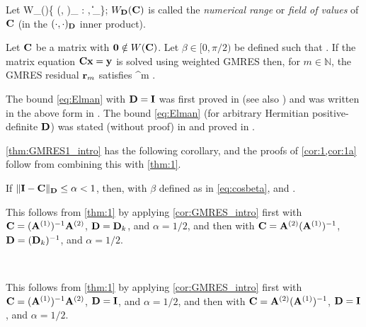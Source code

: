 Let 
\beq\label{eq:fov}
W_\Dmat(\matrixC)\de \Big\{ (\matrixC \bx, \bx)_{\Dmat} : \bx \in \CCN, \|\bx\|_\Big\};
\eeq
$W_{\mathbf{D}}(\mathbf{C})$ is called the \emph{numerical range} or \emph{field of values} of $\mathbf{C}$ (in the $(\cdot,\cdot)_{\mathbf{D}}$ inner product).


\begin{theorem}\label{thm:GMRES1_intro} 
Let $\mathbf{C}$ be a matrix with $\mathbf{0}\notin W(\mathbf{C})$. Let $\beta\in[0,\pi/2)$ be defined such that
\beq\label{eq:cosbeta}
\cos \beta \de {}.
\eeq
If the matrix equation $\mathbf{C} \mathbf{x} = \mathbf{y}$ is solved using weighted GMRES then, 
for $m\in \mathbb{N}$, the GMRES residual $\mathbf{r}_m$ %
satisfies
\beq\label{eq:Elman}
 \leq \sin^m \beta. %
\eeq
\end{theorem}
The bound \cref{eq:Elman} with $\mathbf{D}=\mathbf{I}$ was first proved in \cite[Theorem 6.3]{El:82} (see also \cite[Theorem 3.3]{EiElSc:83}) and was written in the above form in \cite[Equation 1.2]{BeGoTy:06}. The bound \cref{eq:Elman} (for arbitrary Hermitian positive-definite $\mathbf{D}$) was stated (without proof) in \cite{CaWi:92} and proved in \cite[Theorem 5.1]{GrSpVa:17}. %



\cref{thm:GMRES1_intro} has the following corollary, and the proofs of \cref{cor:1,cor:1a} follow from combining this with \cref{thm:1}.

\begin{corollary}
\label{cor:GMRES_intro} 
If $\|\mathbf{I} - \mathbf{C} \|_{\mathbf{D}} \leq \alpha < 1$, then, with $\beta$ defined as in \cref{eq:cosbeta},
\beqs
\cos \beta \geq {}\eeqs
and
\beq\label{eq:gmressin}
\sin \beta \leq {}.
\eeq
\end{corollary}

This follows from \cref{thm:1} by applying \cref{cor:GMRES_intro} first with $\mathbf{C}= (\mathbf{A}^{(1)})^{-1} \mathbf{A}^{(2)}$, $\mathbf{D}=\mathbf{D}_k$, and $\alpha=1/2$, and then with $\mathbf{C}= \mathbf{A}^{(2)}(\mathbf{A}^{(1)})^{-1} $, $\mathbf{D}=(\mathbf{D}_k)^{-1}$, and $\alpha=1/2$.
\epf

\

This follows from \cref{thm:1} by applying \cref{cor:GMRES_intro} first with $\mathbf{C}= (\mathbf{A}^{(1)})^{-1} \mathbf{A}^{(2)}$, $\mathbf{D}=\mathbf{I}$, and $\alpha=1/2$, and then with $\mathbf{C}= \mathbf{A}^{(2)}(\mathbf{A}^{(1)})^{-1} $, $\mathbf{D}=\mathbf{I}$, and $\alpha=1/2$.
\epf


